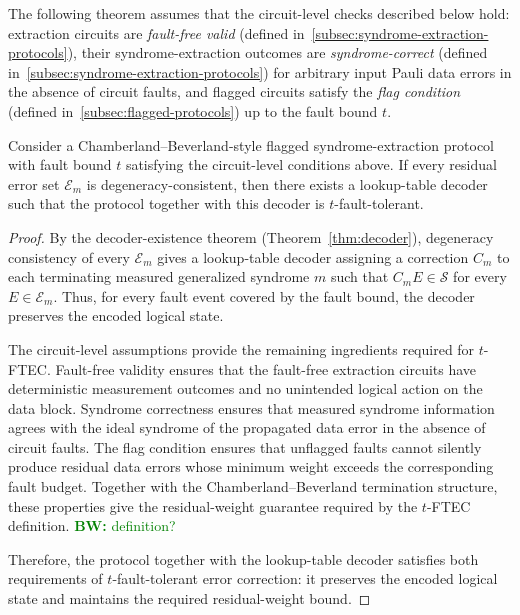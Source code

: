 \documentclass[acmsmall,screen,review,anonymous,nonacm]{acmart}
\newcommand{\showcomment}[1]{#1}
\newcommand{\bw}[1]{\showcomment{\textcolor{green}{\textbf{BW:} #1}}}
\begin{document}
The following theorem assumes that the circuit-level checks described below hold: extraction circuits are \emph{fault-free valid} (defined in~\ref{subsec:syndrome-extraction-protocols}), their syndrome-extraction outcomes are \emph{syndrome-correct} (defined in~\ref{subsec:syndrome-extraction-protocols}) for arbitrary input Pauli data errors in the absence of circuit faults, and flagged circuits satisfy the \emph{flag condition} (defined in~\ref{subsec:flagged-protocols}) up to the fault bound $t$.
\begin{theorem}\label{thm:fault-tolerant-recovery}
Consider a Chamberland--Beverland-style flagged syndrome-extraction protocol with fault bound $t$ satisfying the circuit-level conditions above. If every residual error set $\mathcal{E}_m$ is degeneracy-consistent, then there exists a lookup-table decoder such that the protocol together with this decoder is $t$-fault-tolerant.
\end{theorem}

\begin{proof}
By the decoder-existence theorem (Theorem~\ref{thm:decoder}), degeneracy consistency of every $\mathcal{E}_m$ gives a lookup-table decoder assigning a correction $C_m$ to each terminating measured generalized syndrome $m$ such that $C_mE\in\mathcal{S}$ for every $E\in\mathcal{E}_m$. Thus, for every fault event covered by the fault bound, the decoder preserves the encoded logical state.

The circuit-level assumptions provide the remaining ingredients required for $t$-FTEC. Fault-free validity ensures that the fault-free extraction circuits have deterministic measurement outcomes and no unintended logical action on the data block. Syndrome correctness ensures that measured syndrome information agrees with the ideal syndrome of the propagated data error in the absence of circuit faults. The flag condition ensures that unflagged faults cannot silently produce residual data errors whose minimum weight exceeds the corresponding fault budget. Together with the Chamberland--Beverland termination structure, these properties give the residual-weight guarantee required by the $t$-FTEC definition. \bw{definition?}

Therefore, the protocol together with the lookup-table decoder satisfies both requirements of $t$-fault-tolerant error correction: it preserves the encoded logical state and maintains the required residual-weight bound.
\end{proof}
\end{document}
